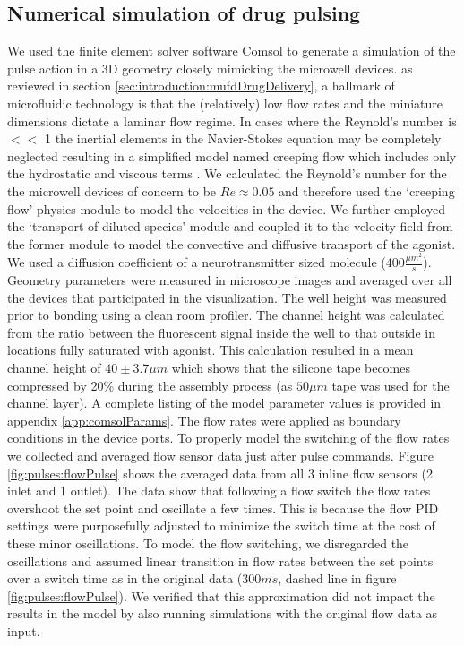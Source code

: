 \subsection{Numerical simulation of drug pulsing}
\label{sec:pulses:comsol}
We used the finite element solver software Comsol to generate a simulation of the pulse action in a 3D geometry closely mimicking the microwell devices. as reviewed in section \ref{sec:introduction:mufdDrugDelivery}, a hallmark of microfluidic technology is that the (relatively) low flow rates and the miniature dimensions dictate a laminar flow regime. In cases where the Reynold's number is \(<<\) 1 the inertial elements in the Navier-Stokes equation may be completely neglected resulting in a simplified model named creeping flow which includes only the hydrostatic and viscous terms \cite{fluidBook}. We calculated the Reynold's number for the the microwell devices of concern to be \(Re\approx 0.05\) and therefore used the `creeping flow' physics module to model the velocities in the device. We further employed the `transport of diluted species' module and coupled it to the velocity field from the former module to model the convective and diffusive transport of the agonist. We used a diffusion coefficient of a neurotransmitter sized molecule (\(400\frac{\mu m^2}{s}\)). Geometry parameters were measured in microscope images and averaged over all the devices that participated in the visualization. The well height was measured prior to bonding using a clean room profiler. The channel height was calculated from the ratio between the fluorescent signal inside the well to that outside in locations fully saturated with agonist. This calculation resulted in a mean channel height of \(40\pm 3.7 \mu m\) which shows that the silicone tape becomes compressed by 20\% during the assembly process (as \(50 \mu m\) tape was used for the channel layer). A complete listing of the model parameter values is provided in appendix \ref{app:comsolParams}. The flow rates were applied as boundary conditions in the device ports. To properly model the switching of the flow rates we collected and averaged flow sensor data just after pulse commands. Figure \ref{fig:pulses:flowPulse} shows the averaged data from all 3 inline flow sensors (2 inlet and 1 outlet). The data show that following a flow switch the flow rates overshoot the set point and oscillate a few times. This is because the flow PID settings were purposefully adjusted to minimize the switch time at the cost of these minor oscillations. To model the flow switching, we disregarded the oscillations and assumed linear transition in flow rates between the set points over a switch time as in the original data (\(300 ms\), dashed line in figure \ref{fig:pulses:flowPulse}). We verified that this approximation did not impact the results in the model by also running simulations with the original flow data as input.

